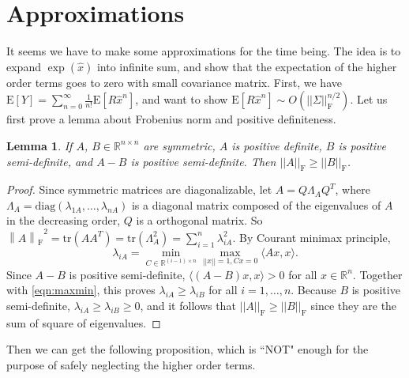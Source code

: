 \documentclass[10pt]{article}
\newtheorem{lemma}{Lemma}
\newcommand{\fnorm}[1]{\ensuremath{\left\| #1 \right\|_\mathrm{F}}}
\begin{document}
\section{Approximations}
It seems we have to make some approximations for the time being.
The idea is to expand $\exp(\hat{x})$ into infinite sum, and show that the expectation of the higher order terms goes to zero with small covariance matrix.
First, we have $\mathrm{E}[Y] = \sum_{n=0}^{\infty}\frac{1}{n!}\mathrm{E}[R\hat{x}^n]$, and want to show $\mathrm{E}[R\hat{x}^n]\sim O(||\Sigma||_\mathrm{F}^{n/2})$.
Let us first prove a lemma about Frobenius norm and positive definiteness.

\begin{lemma} \label{lamma:fnorm}
	If $A$, $B\in\mathbb{R}^{n\times n}$ are symmetric, $A$ is positive definite, $B$ is positive semi-definite, and $A-B$ is positive semi-definite. Then $||A||_\mathrm{F}\geq||B||_\mathrm{F}$.
\end{lemma}
\begin{proof}
	Since symmetric matrices are diagonalizable, let $A=Q\Lambda_AQ^T$, where $\Lambda_A=\mathrm{diag}(\lambda_{1A},\ldots,\lambda_{nA})$ is a diagonal matrix composed of the eigenvalues of $A$ in the decreasing order, $Q$ is a orthogonal matrix.
	So $\fnorm{A}^2 = \mathrm{tr}(AA^T) = \mathrm{tr}(\Lambda_A^2) = \sum_{i=1}^{n}\lambda_{iA}^2$.
	By Courant minimax principle,
	\begin{equation} \label{eqn:maxmin}
		\lambda_{iA} = \min_{C\in\mathbb{R}^{(i-1)\times n}}\max_{||x||=1,Cx=0}\langle Ax,x \rangle.
	\end{equation}
	Since $A-B$ is
	 positive semi-definite, $\langle(A-B)x,x\rangle > 0$ for all $x\in\mathbb{R}^n$.
	Together with \eqref{eqn:maxmin}, this proves $\lambda_{iA}\geq\lambda_{iB}$ for all $i=1,\ldots,n$.
	Because $B$ is positive semi-definite, $\lambda_{iA}\geq\lambda_{iB}\geq 0$, and it follows that $||A||_\mathrm{F}\geq||B||_\mathrm{F}$ since they are the sum of square of eigenvalues.
\end{proof}

Then we can get the following proposition, which is ``NOT" enough for the purpose of safely neglecting the higher order terms.
\end{document}
